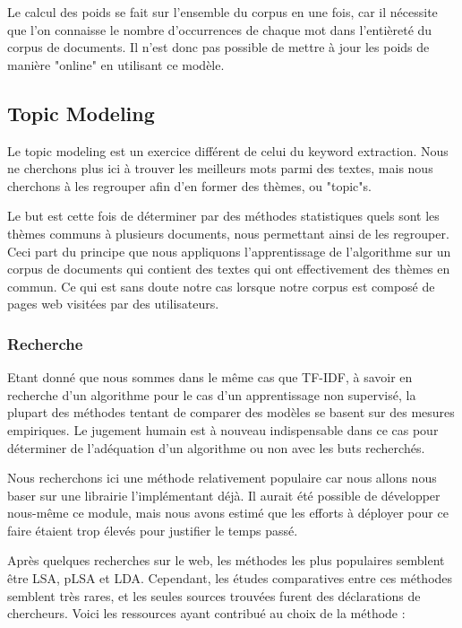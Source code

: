			Le calcul des poids se fait sur l'ensemble du corpus en une fois, car il nécessite que l'on connaisse le nombre d’occurrences de chaque mot dans l'entièreté du corpus de documents. Il n'est donc pas possible de mettre à jour les poids de manière "online" en utilisant ce modèle.

	\subsection{Topic Modeling}

		Le topic modeling est un exercice différent de celui du keyword extraction. Nous ne cherchons plus ici à trouver les meilleurs mots parmi des textes, mais nous cherchons à les regrouper afin d'en former des thèmes, ou "topic"s.

		Le but est cette fois de déterminer par des méthodes statistiques quels sont les thèmes communs à plusieurs documents, nous permettant ainsi de les regrouper. Ceci part du principe que nous appliquons l'apprentissage de l'algorithme sur un corpus de documents qui contient des textes qui ont effectivement des thèmes en commun. Ce qui est sans doute notre cas lorsque notre corpus est composé de pages web visitées par des utilisateurs.

		\subsubsection{Recherche}

			Etant donné que nous sommes dans le même cas que TF-IDF, à savoir en recherche d'un algorithme pour le cas d'un apprentissage non supervisé, la plupart des méthodes tentant de comparer des modèles se basent sur des mesures empiriques. Le jugement humain est à nouveau indispensable dans ce cas pour déterminer de l'adéquation d'un algorithme ou non avec les buts recherchés.

			Nous recherchons ici une méthode relativement populaire car nous allons nous baser sur une librairie l'implémentant déjà. Il aurait été possible de développer nous-même ce module, mais nous avons estimé que les efforts à déployer pour ce faire étaient trop élevés pour justifier le temps passé.

			Après quelques recherches sur le web, les méthodes les plus populaires semblent être LSA, pLSA et LDA\cite{stanford-topicmodel}. Cependant, les études comparatives entre ces méthodes semblent très rares, et les seules sources trouvées furent des déclarations de chercheurs. Voici les ressources ayant contribué au choix de la méthode :


